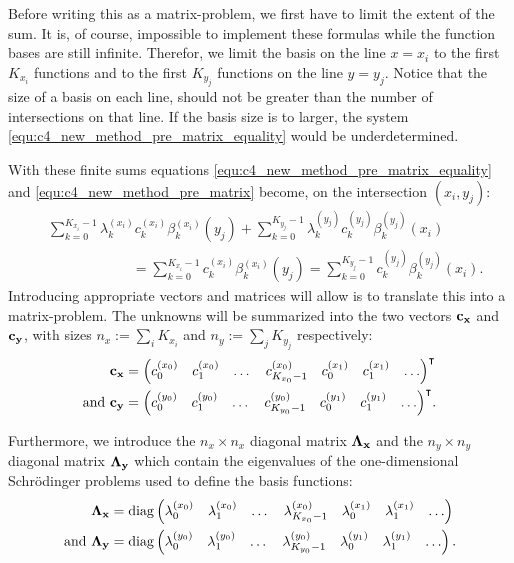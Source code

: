Before writing this as a matrix-problem, we first have to limit the extent of the sum. It is, of course, impossible to implement these formulas while the function bases are still infinite. Therefor, we limit the basis on the line $x = x_i$ to the first $K_{x_i}$ functions and to the first $K_{y_j}$ functions on the line $y = y_j$. Notice that the size of a basis on each line, should not be greater than the number of intersections on that line. If the basis size is to larger, the system \eqref{equ:c4_new_method_pre_matrix_equality} would be underdetermined.

With these finite sums equations \eqref{equ:c4_new_method_pre_matrix_equality} and \eqref{equ:c4_new_method_pre_matrix} become, on the intersection $(x_i, y_j)$:
\begin{align}
     & \sum_{k=0}^{K_{x_i}-1} \lambda_k^{(x_i)} c_k^{(x_i)} \beta^{(x_i)}_k(y_j) + \sum_{k=0}^{K_{y_j}-1} \lambda_k^{(y_j)} c_k^{(y_j)} \beta_k^{(y_j)}(x_i)\nonumber                                  \\
     & \qquad\qquad\qquad     = \sum_{k=0}^{K_{x_i}-1} c_k^{(x_i)} \beta_k^{(x_i)}(y_j) = \sum_{k=0}^{K_{y_j}-1} c_k^{(y_j)} \beta_k^{(y_j)}(x_i) \text{.}\label{equ:c4_new_method_pre_matrix_unified}
\end{align}
Introducing appropriate vectors and matrices will allow is to translate this into a matrix-problem. The unknowns will be summarized into the two vectors $\vb{c_x}$ and $\vb{c_y}$, with sizes $n_x := \sum_i K_{x_i}$ and $n_y := \sum_j K_{y_j}$ respectively:
\begin{align*}
    \vb{c_x}            & = {\begin{pmatrix} c_0^{(x_0)} & c_1^{(x_0)} & \dots & c_{K_{x_0}-1}^{(x_0)} & c_0^{(x_1)} & c_1^{(x_1)} & \dots \end{pmatrix}}^\intercal         \\
    \text{and }\vb{c_y} & = {\begin{pmatrix} c_0^{(y_0)} & c_1^{(y_0)} & \dots & c_{K_{y_0}-1}^{(y_0)} & c_0^{(y_1)} & c_1^{(y_1)} & \dots \end{pmatrix}}^\intercal\text{.}
\end{align*}

Furthermore, we introduce the $n_x \times n_x$ diagonal matrix $\vb{\Lambda_x}$ and the $n_y \times n_y$ diagonal matrix $\vb{\Lambda_y}$ which contain the eigenvalues of the one-dimensional Schrödinger problems used to define the basis functions:
\begin{align*}
    \vb{\Lambda_x}            & = \operatorname{diag}\begin{pmatrix} \lambda_0^{(x_0)} & \lambda_1^{(x_0)} & \dots & \lambda_{K_{x_0}-1}^{(x_0)} & \lambda_0^{(x_1)} & \lambda_1^{(x_1)} & \dots \end{pmatrix}         \\
    \text{and }\vb{\Lambda_y} & = \operatorname{diag}\begin{pmatrix} \lambda_0^{(y_0)} & \lambda_1^{(y_0)} & \dots & \lambda_{K_{y_0}-1}^{(y_0)} & \lambda_0^{(y_1)} & \lambda_1^{(y_1)} & \dots \end{pmatrix}\text{.} \\
\end{align*}

